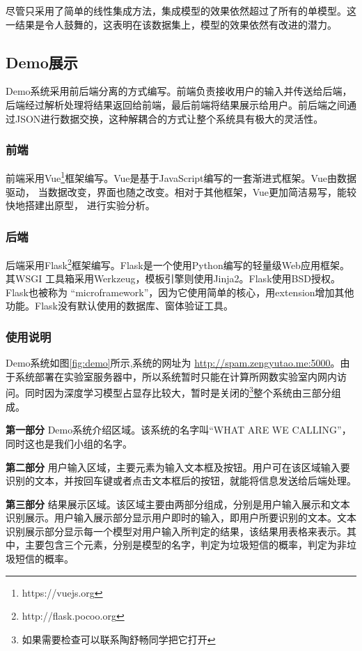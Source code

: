 \documentclass[a4paper]{article}
\begin{document}
尽管只采用了简单的线性集成方法，集成模型的效果依然超过了所有的单模型。这一结果是令人鼓舞的，这表明在该数据集上，模型的效果依然有改进的潜力。

\subsection{Demo展示}
Demo系统采用前后端分离的方式编写。前端负责接收用户的输入并传送给后端，后端经过解析处理将结果返回给前端，最后前端将结果展示给用户。前后端之间通过JSON进行数据交换，这种解耦合的方式让整个系统具有极大的灵活性。

\subsubsection{前端}
前端采用Vue\footnote{https://vuejs.org}框架编写。Vue是基于JavaScript编写的一套渐进式框架。Vue由数据驱动， 当数据改变，界面也随之改变。相对于其他框架，Vue更加简洁易写，能较快地搭建出原型， 进行实验分析。

\subsubsection{后端}
后端采用Flask\footnote{http://flask.pocoo.org}框架编写。Flask是一个使用Python编写的轻量级Web应用框架。其WSGI 工具箱采用Werkzeug，模板引擎则使用Jinja2。Flask使用BSD授权。Flask也被称为 “microframework”，因为它使用简单的核心，用extension增加其他功能。Flask没有默认使用的数据库、窗体验证工具。

\subsubsection{使用说明}
Demo系统如图\ref{fig:demo}所示,系统的网址为 \url{http://spam.zengyutao.me:5000}。由于系统部署在实验室服务器中，所以系统暂时只能在计算所网数实验室内网内访问。同时因为深度学习模型占显存比较大，暂时是关闭的\footnote{如果需要检查可以联系陶舒畅同学把它打开}整个系统由三部分组成。

\textbf{第一部分}
Demo系统介绍区域。该系统的名字叫“WHAT ARE WE CALLING”，同时这也是我们小组的名字。

\textbf{第二部分}
用户输入区域，主要元素为输入文本框及按钮。用户可在该区域输入要识别的文本，并按回车键或者点击文本框后的按钮，就能将信息发送给后端处理。

\textbf{第三部分}
结果展示区域。该区域主要由两部分组成，分别是用户输入展示和文本识别展示。用户输入展示部分显示用户即时的输入，即用户所要识别的文本。文本识别展示部分显示每一个模型对用户输入所判定的结果，该结果用表格来表示。其中，主要包含三个元素，分别是模型的名字，判定为垃圾短信的概率，判定为非垃圾短信的概率。
\end{document}
